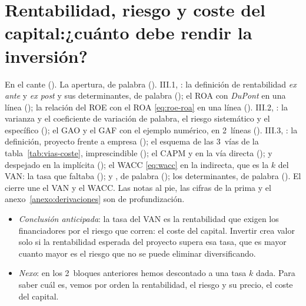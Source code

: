 \documentclass[11pt]{article}
\begin{document}
\section{Rentabilidad, riesgo y coste del capital:\newline ¿cuánto debe rendir la inversión?}\label{sec:rentabilidad-riesgo-coste}

\begin{notaopositor}
En el cante (). La apertura, de palabra (). III.1, : la definición de rentabilidad \emph{ex ante} y \emph{ex post} y sus determinantes, de palabra (); el ROA con \emph{DuPont} en una línea (); la relación del ROE con el ROA \eqref{eq:roe-roa} en una línea (). III.2, : la varianza y el coeficiente de variación de palabra, el riesgo sistemático y el específico (); el GAO y el GAF con el ejemplo numérico, en 2~líneas (). III.3, : la definición, proyecto frente a empresa (); el esquema de las 3~vías de la tabla~\ref{tab:vias-coste}, imprescindible (); el CAPM y  en la vía directa ();  y  despejado en la implícita (); el WACC \eqref{eq:wacc} en la indirecta, que es la $k$ del VAN: la tasa que faltaba ();  y , de palabra (); los determinantes, de palabra (). El cierre une el VAN y el WACC. Las notas al pie, las cifras de la prima y el anexo~\ref{anexo:derivaciones} son de profundización.
\end{notaopositor}

\begin{itemize}
\item \emph{Conclusión anticipada}: la tasa del VAN es la rentabilidad que exigen los financiadores por el riesgo que corren: el coste del capital. Invertir crea valor solo si la rentabilidad esperada del proyecto supera esa tasa, que es mayor cuanto mayor es el riesgo que no se puede eliminar diversificando.
\item \emph{Nexo}: en los 2~bloques anteriores hemos descontado a una tasa $k$ dada. Para saber cuál es, vemos por orden la rentabilidad, el riesgo y su precio, el coste del capital.
\end{itemize}

\end{document}
